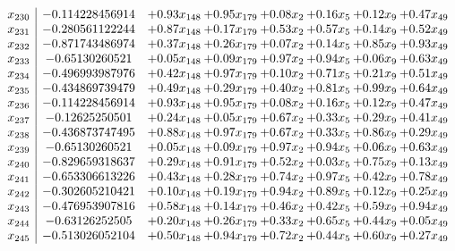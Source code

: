 \documentclass[8pt]{article}
\begin{document}
\[\begin{array}{c| c c@{\hskip 2pt} c@{\hskip 2pt} c@{\hskip 2pt} c@{\hskip 2pt} c@{\hskip 2pt} c@{\hskip 2pt} }
 x_{230}   &  -0.114228456914 & +  0.93 x_{148} & +  0.95 x_{179} & +  0.08 x_{2} & +  0.16 x_{5} & +  0.12 x_{9} & +  0.47 x_{49}\\
 x_{231}   &  -0.280561122244 & +  0.87 x_{148} & +  0.17 x_{179} & +  0.53 x_{2} & +  0.57 x_{5} & +  0.14 x_{9} & +  0.52 x_{49}\\
 x_{232}   &  -0.871743486974 & +  0.37 x_{148} & +  0.26 x_{179} & +  0.07 x_{2} & +  0.14 x_{5} & +  0.85 x_{9} & +  0.93 x_{49}\\
 x_{233}   &  -0.65130260521 & +  0.05 x_{148} & +  0.09 x_{179} & +  0.97 x_{2} & +  0.94 x_{5} & +  0.06 x_{9} & +  0.63 x_{49}\\
 x_{234}   &  -0.496993987976 & +  0.42 x_{148} & +  0.97 x_{179} & +  0.10 x_{2} & +  0.71 x_{5} & +  0.21 x_{9} & +  0.51 x_{49}\\
 x_{235}   &  -0.434869739479 & +  0.49 x_{148} & +  0.29 x_{179} & +  0.40 x_{2} & +  0.81 x_{5} & +  0.99 x_{9} & +  0.64 x_{49}\\
 x_{236}   &  -0.114228456914 & +  0.93 x_{148} & +  0.95 x_{179} & +  0.08 x_{2} & +  0.16 x_{5} & +  0.12 x_{9} & +  0.47 x_{49}\\
 x_{237}   &  -0.12625250501 & +  0.24 x_{148} & +  0.05 x_{179} & +  0.67 x_{2} & +  0.33 x_{5} & +  0.29 x_{9} & +  0.41 x_{49}\\
 x_{238}   &  -0.436873747495 & +  0.88 x_{148} & +  0.97 x_{179} & +  0.67 x_{2} & +  0.33 x_{5} & +  0.86 x_{9} & +  0.29 x_{49}\\
 x_{239}   &  -0.65130260521 & +  0.05 x_{148} & +  0.09 x_{179} & +  0.97 x_{2} & +  0.94 x_{5} & +  0.06 x_{9} & +  0.63 x_{49}\\
 x_{240}   &  -0.829659318637 & +  0.29 x_{148} & +  0.91 x_{179} & +  0.52 x_{2} & +  0.03 x_{5} & +  0.75 x_{9} & +  0.13 x_{49}\\
 x_{241}   &  -0.653306613226 & +  0.43 x_{148} & +  0.28 x_{179} & +  0.74 x_{2} & +  0.97 x_{5} & +  0.42 x_{9} & +  0.78 x_{49}\\
 x_{242}   &  -0.302605210421 & +  0.10 x_{148} & +  0.19 x_{179} & +  0.94 x_{2} & +  0.89 x_{5} & +  0.12 x_{9} & +  0.25 x_{49}\\
 x_{243}   &  -0.476953907816 & +  0.58 x_{148} & +  0.14 x_{179} & +  0.46 x_{2} & +  0.42 x_{5} & +  0.59 x_{9} & +  0.94 x_{49}\\
 x_{244}   &  -0.63126252505 & +  0.20 x_{148} & +  0.26 x_{179} & +  0.33 x_{2} & +  0.65 x_{5} & +  0.44 x_{9} & +  0.05 x_{49}\\
 x_{245}   &  -0.513026052104 & +  0.50 x_{148} & +  0.94 x_{179} & +  0.72 x_{2} & +  0.44 x_{5} & +  0.60 x_{9} & +  0.27 x_{49}\\

\end{array}\]
\end{document}

